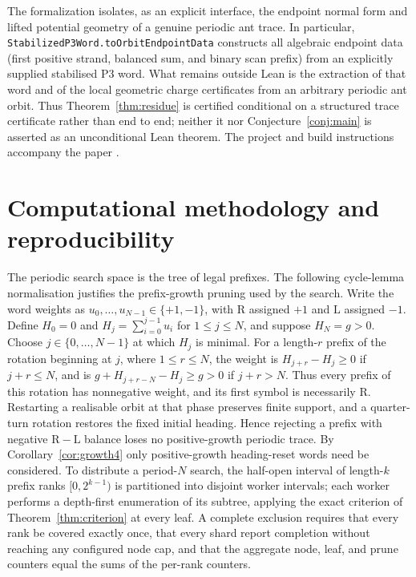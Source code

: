\documentclass[11pt,letterpaper]{article}
\theoremstyle{plain}
\theoremstyle{definition}
\newcommand{\growth}{g}
\newcommand{\turnR}{\mathrm{R}}
\newcommand{\turnL}{\mathrm{L}}
\begin{document}
\begin{NoHyper}
The formalization isolates, as an explicit interface, the endpoint normal form and
lifted potential geometry of a genuine periodic ant trace. In particular,
\texttt{StabilizedP3Word.toOrbitEndpointData} constructs all algebraic endpoint data
(first positive strand, balanced sum, and binary scan prefix) from an explicitly
supplied stabilised P3 word. What remains outside Lean is the extraction of that word
and of the local geometric charge certificates from an arbitrary periodic ant orbit.
Thus Theorem~\ref{thm:residue} is certified conditional on a structured trace
certificate rather than end to end; neither it nor Conjecture~\ref{conj:main} is
asserted as an unconditional Lean theorem. The project and build instructions
accompany the paper \cite{Repo}.

\section{Computational methodology and reproducibility}\label{app:repro}

The periodic search space is the tree of legal prefixes. The following cycle-lemma
normalisation justifies the prefix-growth pruning used by the search. Write the word
weights as $u_0,\ldots,u_{N-1}\in\{+1,-1\}$, with $\turnR$ assigned $+1$ and
$\turnL$ assigned $-1$. Define $H_0=0$ and
$H_j=\sum_{i=0}^{j-1}u_i$ for $1\le j\le N$, and suppose
$H_N=\growth>0$. Choose $j\in\{0,\ldots,N-1\}$ at which $H_j$ is minimal. For a
length-$r$ prefix of the rotation beginning at $j$, where $1\le r\le N$, the weight
is $H_{j+r}-H_j\ge0$ if $j+r\le N$, and is
$\growth+H_{j+r-N}-H_j\ge\growth>0$ if $j+r>N$. Thus every prefix of this rotation
has nonnegative weight, and its first symbol is necessarily $\turnR$. Restarting a
realisable orbit at that phase
preserves finite support, and a quarter-turn rotation restores the fixed initial
heading. Hence rejecting a prefix with negative $\turnR-\turnL$ balance loses no
positive-growth periodic trace. By Corollary~\ref{cor:growth4} only positive-growth
heading-reset words need be considered. To distribute a
period-$N$ search, the half-open interval of length-$k$ prefix ranks $[0,2^{k-1})$ is
partitioned into disjoint worker intervals; each worker performs a depth-first
enumeration of its subtree, applying the exact criterion of
Theorem~\ref{thm:criterion} at every leaf. A complete exclusion requires that every
rank be covered exactly once, that every shard report completion without reaching any
configured node cap, and
that the aggregate node, leaf, and prune counters equal the sums of the per-rank
counters.


\end{NoHyper}
\end{document}
